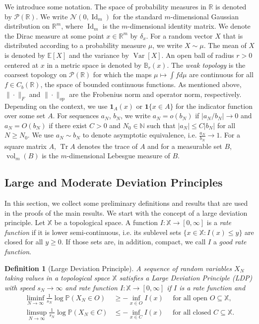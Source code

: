 \documentclass[11pt,a4paper,twoside]{article}
\renewcommand{\P}{\mathbb P}
\newcommand{\E}{\mathbb E}
\newcommand{\R}{\mathbb R}
\newcommand{\N}{\mathbb N}
\DeclareMathOperator{\Var}{Var}
\DeclareMathOperator{\vol}{vol}
\DeclareMathOperator{\Tr}{Tr}
\newtheorem{df}[thm]{Definition}
\theoremstyle{definition}
\begin{document}
We introduce some notation. The space of probability measures in $\R$ is denoted by $\mathcal{P}(\R)$. We write $\mathcal{N}(0,\operatorname{Id}_m)$ for the standard $m$-dimensional Gaussian distribution on $\R^m$, where $\operatorname{Id}_m$ is the $m$-dimensional identity matrix. We denote the Dirac measure at some point $x\in \R^m$ by $\delta_x$. For a random vector $X$ that is distributed according to a probability measure $\mu$, we write $X\sim \mu$. The mean of $X$ is denoted by $\E[X]$ and the variance by $\Var[X]$. An open ball of radius $r > 0$ centered at $x$ in a metric space is denoted by $\mathbb{B}_r(x)$. The \emph{weak topology} is the coarsest topology on $\mathcal{P}(\R)$ for which the maps $\mu \mapsto \int f d\mu$ are continuous for all $f \in C_b(\R)$, the space of bounded continuous functions. As mentioned above, $\|\cdot\|_F$ and $\|\cdot\|_{op}$ are the Frobenius norm and operator norm, respectively. Depending on the context, we use $\mathbf{1}_{A}(x)$ or $\mathbf{1}\{x\in A\}$ for the indicator function over some set $A$. For sequences $a_N$, $b_N$, we write $a_N = o(b_N)$ if $|a_N/b_N| \to 0$ and $a_N = O(b_N)$ if there exist $C>0$ and $N_0\in\N$ such that $|a_N|\le C|b_N|$ for all $N\ge N_0$. We use $a_N \sim b_N$ to denote asymptotic equivalence, i.e. $\frac{a_N}{b_N}\to 1$. For a square matrix $A$, $\Tr{A}$ denotes the trace of $A$ and for a measurable set $B$, $\vol_m(B)$ is the $m$-dimensional Lebesgue measure of $B$. 
	
	\subsection{Large and Moderate Deviation Principles}

	In this section, we collect some preliminary definitions and results that are used in the proofs of the main results. We start with the concept of a large deviation principle. Let $\mathbb{X}$ be a topological space. A function $I:\mathbb{X}\to[0,\infty]$ is a \emph{rate function} if it is lower semi-continuous, i.e. its sublevel sets $\{x\in\mathbb{X}: I(x)\le y\}$ are closed for all $y \ge 0$. If those sets are, in addition, compact, we call $I$ a \emph{good rate function}.

	\begin{df}[Large Deviation Principle]\label{def:LDP_main} 
		A sequence of random variables $X_N$ taking values in a topological space $\mathbb{X}$ satisfies a \emph{Large Deviation Principle (LDP)} with \emph{speed} $s_N \to \infty$ and \emph{rate function} $I:\mathbb{X}\to [0,\infty]$ if $I$ is a rate function and
		\begin{align}
			\liminf_{N\to\infty} \frac{1}{s_N}\log \P(X_N \in O) &\ge -\inf_{x\in O}I(x) \quad \text{ for all open } O\subseteq\mathbb{X},\label{LDPlowerbound_main}\\ 
			\limsup_{N\to\infty} \frac{1}{s_N}\log \P(X_N\in C) &\le -\inf_{x\in C}I(x) \quad \text{ for all closed } C\subseteq\mathbb{X}\label{LDPupperbound_main}.
		\end{align}
	\end{df}
\end{document}
